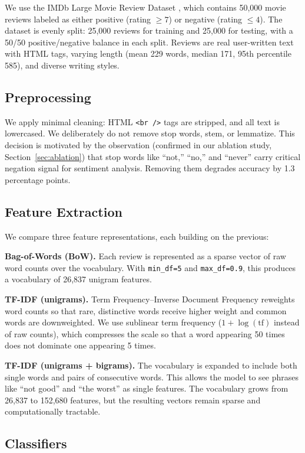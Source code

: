 \documentclass[11pt]{article}
\begin{document}
We use the IMDb Large Movie Review Dataset \citep{maas2011learning}, which contains 50,000 movie reviews labeled as either positive (rating $\geq 7$) or negative (rating $\leq 4$). The dataset is evenly split: 25,000 reviews for training and 25,000 for testing, with a 50/50 positive/negative balance in each split. Reviews are real user-written text with HTML tags, varying length (mean 229 words, median 171, 95th percentile 585), and diverse writing styles.

\subsection{Preprocessing}

We apply minimal cleaning: HTML \texttt{<br />} tags are stripped, and all text is lowercased. We deliberately do not remove stop words, stem, or lemmatize. This decision is motivated by the observation (confirmed in our ablation study, Section~\ref{sec:ablation}) that stop words like ``not,'' ``no,'' and ``never'' carry critical negation signal for sentiment analysis. Removing them degrades accuracy by 1.3 percentage points.

\subsection{Feature Extraction}

We compare three feature representations, each building on the previous:

\textbf{Bag-of-Words (BoW).} Each review is represented as a sparse vector of raw word counts over the vocabulary. With \texttt{min\_df=5} and \texttt{max\_df=0.9}, this produces a vocabulary of 26,837 unigram features.

\textbf{TF-IDF (unigrams).} Term Frequency--Inverse Document Frequency reweights word counts so that rare, distinctive words receive higher weight and common words are downweighted. We use sublinear term frequency ($1 + \log(\text{tf})$ instead of raw counts), which compresses the scale so that a word appearing 50 times does not dominate one appearing 5 times.

\textbf{TF-IDF (unigrams + bigrams).} The vocabulary is expanded to include both single words and pairs of consecutive words. This allows the model to see phrases like ``not good'' and ``the worst'' as single features. The vocabulary grows from 26,837 to 152,680 features, but the resulting vectors remain sparse and computationally tractable.

\subsection{Classifiers}
\end{document}
